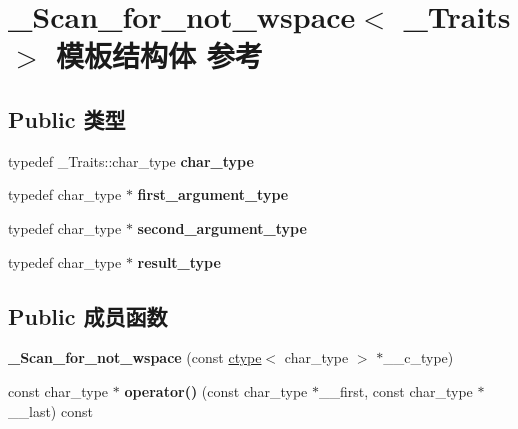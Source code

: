\hypertarget{struct___scan__for__not__wspace}{}\section{\+\_\+\+Scan\+\_\+for\+\_\+not\+\_\+wspace$<$ \+\_\+\+Traits $>$ 模板结构体 参考}
\label{struct___scan__for__not__wspace}
\subsection*{Public 类型}
\begin{DoxyCompactItemize}
\item 
\mbox{\label{struct___scan__for__not__wspace_a1c3f6bdc9fe69c2a4cca8baf47caf966}} 
typedef \+\_\+\+Traits\+::char\+\_\+type {\bfseries char\+\_\+type}
\item 
\mbox{\label{struct___scan__for__not__wspace_a7856e4b621c58bafe61efcbf40be68a4}} 
typedef char\+\_\+type $\ast$ {\bfseries first\+\_\+argument\+\_\+type}
\item 
\mbox{\label{struct___scan__for__not__wspace_a9f356b4be95e8f49e6e2de45766e7000}} 
typedef char\+\_\+type $\ast$ {\bfseries second\+\_\+argument\+\_\+type}
\item 
\mbox{\label{struct___scan__for__not__wspace_a5263839ca40760a08201bab453e9de20}} 
typedef char\+\_\+type $\ast$ {\bfseries result\+\_\+type}
\end{DoxyCompactItemize}
\subsection*{Public 成员函数}
\begin{DoxyCompactItemize}
\item 
\mbox{\label{struct___scan__for__not__wspace_a3951d612d0c6d5bac2aaa98f4ced5df7}} 
{\bfseries \+\_\+\+Scan\+\_\+for\+\_\+not\+\_\+wspace} (const \hyperlink{classctype}{ctype}$<$ char\+\_\+type $>$ $\ast$\+\_\+\+\_\+c\+\_\+type)
\item 
\mbox{\label{struct___scan__for__not__wspace_abadc9b1b98bbd844fc13d16098c476b8}} 
const char\+\_\+type $\ast$ {\bfseries operator()} (const char\+\_\+type $\ast$\+\_\+\+\_\+first, const char\+\_\+type $\ast$\+\_\+\+\_\+last) const
\end{DoxyCompactItemize}
